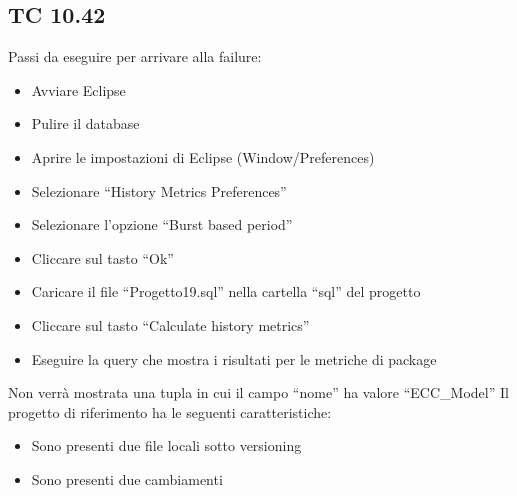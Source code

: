 \subsection*{TC 10.42}
Passi da eseguire per arrivare alla failure:
\begin{itemize}
 \item Avviare Eclipse
 \item Pulire il database
 \item Aprire le impostazioni di Eclipse (Window/Preferences)
 \item Selezionare ``History Metrics Preferences''
 \item Selezionare l'opzione ``Burst based period''
 \item Cliccare sul tasto ``Ok''
 \item Caricare il file ``Progetto19.sql'' nella cartella ``sql'' del progetto
 \item Cliccare sul tasto ``Calculate history metrics''
 \item Eseguire la query che mostra i risultati per le metriche di package
\end{itemize}
Non verrà mostrata una tupla in cui il campo ``nome'' ha valore ``ECC\_Model''
\vspace{0.5cm}
\newline
Il progetto di riferimento ha le seguenti caratteristiche:
\begin{itemize}
 \item Sono presenti due file locali sotto versioning
 \item Sono presenti due cambiamenti
\end{itemize}





\newpage





